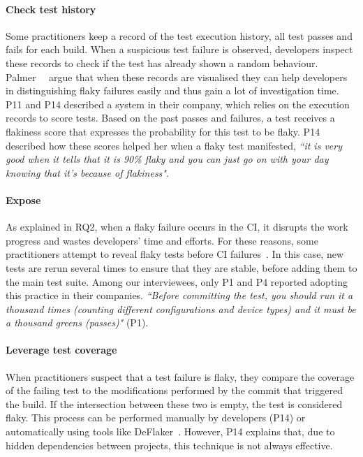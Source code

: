 \paragraph{\textbf{Check test history}}
Some practitioners keep a record of the test execution history, \ie all test passes and fails for each build.
When a suspicious test failure is observed, developers inspect these records to check if the test has already shown a random behaviour.
Palmer~\etal~\cite{TestFlak61:online} argue that when these records are visualised they can help developers in distinguishing flaky failures easily and thus gain a lot of investigation time.
P11 and P14 described a system in their company, which relies on the execution records to score tests.
Based on the past passes and failures, a test receives a flakiness score that expresses the probability for this test to be flaky.
P14 described how these scores helped her when a flaky test manifested, \textit{``it is very good when it tells that it is 90\% flaky and you can just go on with your day knowing that it's because of flakiness"}.

\paragraph{\textbf{Expose}}
As explained in RQ2, when a flaky failure occurs in the CI, it disrupts the work progress and wastes developers' time and efforts.
For these reasons, some practitioners attempt to reveal flaky tests before CI failures~\cite{Amachine72:online,TestFlak61:online}.
In this case, new tests are rerun several times to ensure that they are stable, before adding them to the main test suite.
Among our interviewees, only P1 and P4 reported adopting this practice in their companies.
\textit{``Before committing the test, you should run it a thousand times (counting different configurations and device types) and it must be a thousand greens (passes)"} (P1).


\paragraph{\textbf{Leverage test coverage}}
When practitioners suspect that a test failure is flaky, they compare the coverage of the failing test to the modifications performed by the commit that triggered the build.
If the intersection between these two is empty, the test is considered flaky.
This process can be performed manually by developers (P14) or automatically using tools like DeFlaker~\cite{bell_deflaker_2018}.
However, P14 explains that, due to hidden dependencies between projects, this technique is not always effective.



